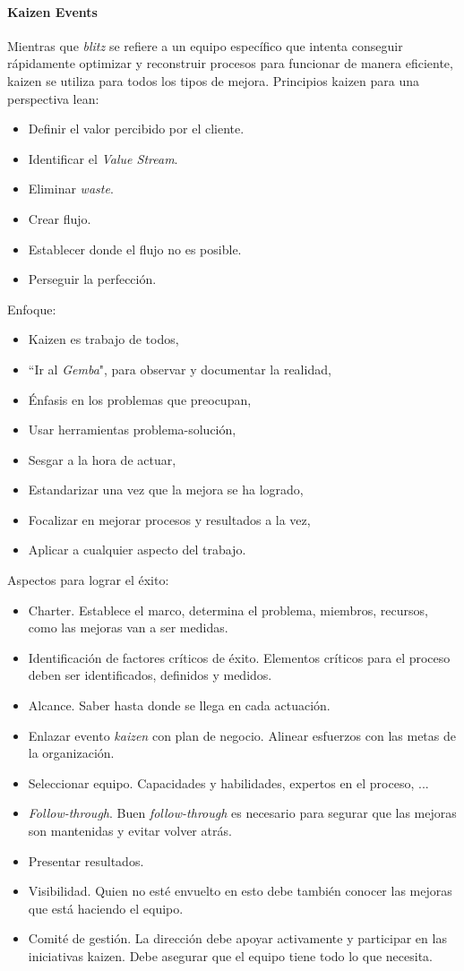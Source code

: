 \documentclass[]{article}
\begin{document}
\paragraph{Kaizen Events}
Mientras que \textit{blitz} se refiere a un equipo específico que intenta conseguir rápidamente optimizar y reconstruir procesos para funcionar de manera eficiente, kaizen se utiliza para todos los tipos de mejora. Principios kaizen para una perspectiva lean:
\begin{itemize}
	\item Definir el valor percibido por el cliente.
	\item Identificar el \textit{Value Stream}.
	\item Eliminar \textit{waste}.
	\item Crear flujo.
	\item Establecer donde el flujo no es posible.
	\item Perseguir la perfección.
\end{itemize}
Enfoque:
\begin{itemize}
	\item Kaizen es trabajo de todos,
	\item ``Ir al \textit{Gemba}", para observar y documentar la realidad,
	\item Énfasis en los problemas que preocupan,
	\item Usar herramientas problema-solución,
	\item Sesgar a la hora de actuar,
	\item Estandarizar una vez que la mejora se ha logrado,
	\item Focalizar en mejorar procesos y resultados a la vez,
	\item Aplicar a cualquier aspecto del trabajo.
\end{itemize}
Aspectos para lograr el éxito:
\begin{itemize}
	\item Charter. Establece el marco, determina el problema, miembros, recursos, como las mejoras van a ser medidas.
	\item Identificación de factores críticos de éxito. Elementos críticos para el proceso deben ser identificados, definidos y medidos.
	\item Alcance. Saber hasta donde se llega en cada actuación.
	\item Enlazar evento \textit{kaizen} con plan de negocio. Alinear esfuerzos con las metas de la organización.
	\item Seleccionar equipo. Capacidades y habilidades, expertos en el proceso, ...
	\item \textit{Follow-through}. Buen \textit{follow-through} es necesario para segurar que las mejoras son mantenidas y evitar volver atrás.
	\item Presentar resultados. 
	\item Visibilidad. Quien no esté envuelto en esto debe también conocer las mejoras que está haciendo el equipo.
	\item Comité de gestión. La dirección debe apoyar activamente y participar en las iniciativas kaizen. Debe asegurar que el equipo tiene todo lo que necesita.
\end{itemize}
\end{document}
